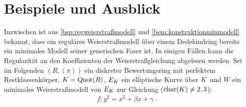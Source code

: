 \chapter{Beispiele und Ausblick}\label{chap:ausblick}
Inzwischen ist aus \ref{bsp:regweierstraßmodell} und
\ref{bem:konstruktionminmodell} bekannt, dass ein reguläres
Weierstraßmodell über einem Dedekindring bereits ein minimales Modell
seiner generischen Faser ist.
In einigen Fällen kann die Regularität an den
Koeffizienten der Weierstraßgleichung abgelesen werden.
Sei im Folgenden $(R,(\pi))$ ein diskreter Bewertungsring mit
perfektem Restklassenkörper, ${K=\operatorname{Quot}(R)}$, $E_{K}$ ein elliptische
Kurve über $K$ und $W$ ein minimales Weierstraßmodell von $E_{K}$ zur
Gleichung ($\operatorname{char}(K)\neq2,3$):
\begin{gather}\label{eq:allgweierstraßgleichung}
  f\colon y^2=x^3 + \beta x + \gamma\;.
\end{gather}

